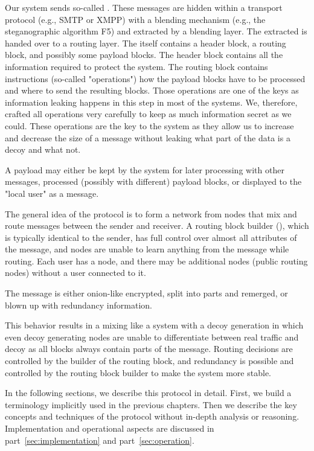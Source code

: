 Our system sends so-called \VortexMessages. These messages are hidden within a transport protocol (e.g., SMTP or XMPP) with a blending mechanism (e.g., the steganographic algorithm F5) and extracted by a blending layer. The extracted \VortexMessage{} is handed over to a routing layer. The \VortexMessage{} itself contains a header block, a routing block, and possibly some payload blocks. The header block contains all the information required to protect the system. The routing block contains instructions (so-called "operations") how the payload blocks have to be processed and where to send the resulting blocks. Those operations are one of the keys as information leaking happens in this step in most of the systems. We, therefore, crafted all operations very carefully to keep as much information secret as we could. These operations are the key to the system as they allow us to increase and decrease the size of a message without leaking what part of the data is a decoy and what not.

A payload may either be kept by the system for later processing with other messages, processed (possibly with different) payload blocks, or displayed to the "local user" as a message.

The general idea of the protocol is to form a network from nodes that mix and route messages between the sender and receiver. A routing block builder (), which is typically identical to the sender, has full control over almost all attributes of the message, and nodes are unable to learn anything from the message while routing. Each user has a node, and there may be additional nodes (public routing nodes) without a user connected to it. 

The message is either onion-like encrypted, split into parts and remerged, or blown up with redundancy information. 

This behavior results in a mixing like a system with a decoy generation in which even decoy generating nodes are unable to differentiate between real traffic and decoy as all blocks always contain parts of the message. Routing decisions are controlled by the builder of the routing block, and redundancy is possible and controlled by the routing block builder to make the system more stable.

In the following sections, we describe this protocol in detail. First, we build a terminology implicitly used in the previous chapters. Then we describe the key concepts and techniques of the protocol without in-depth analysis or reasoning. Implementation and operational aspects are discussed in part~\ref{sec:implementation} and part~\ref{sec:operation}. 


